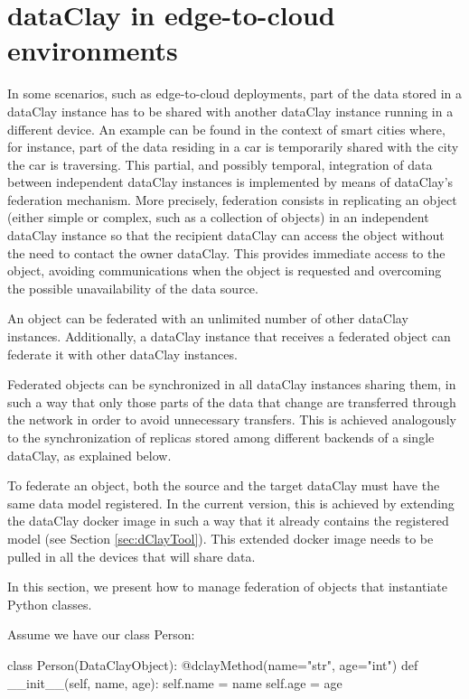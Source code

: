 \section{dataClay in edge-to-cloud environments}
\label{sec:pFederation}

In some scenarios, such as edge-to-cloud deployments, part of the data stored in a dataClay instance has to be shared with another dataClay instance running in a different device. An example can be found in the context of smart cities where, for instance, part of the data residing in a car is temporarily shared with the city the car is traversing. This partial, and possibly temporal, integration of data between independent dataClay instances is implemented by means of dataClay's federation mechanism.
More precisely, federation consists in replicating an object (either simple or complex, such as a collection of objects) in an independent dataClay instance so that the recipient dataClay can access the object without the need to contact the owner dataClay. This provides immediate access to the object, avoiding communications when the object is requested and overcoming the possible unavailability of the data source. 

An object can be federated with an unlimited number of other dataClay instances. Additionally, a dataClay instance that receives a federated object can federate it with other dataClay instances.

Federated objects can be synchronized in all dataClay instances sharing them, in such a way that only those parts of the data that change are transferred through the network in order to avoid unnecessary transfers. This is achieved analogously to the synchronization of replicas stored among different backends of a single dataClay, as explained below. 

To federate an object, both the source and the target dataClay must have the same data model registered. In the current version, this is achieved by extending the dataClay docker image in such a way that it already contains the registered model (see Section \ref{sec:dClayTool}). This extended docker image needs to be pulled in all the devices that will share data.

In this section, we present how to manage federation of objects that instantiate Python classes. 

Assume we have our class Person:

\begin{tBox}
\begin{python}
class Person(DataClayObject):
    @dclayMethod(name="str", age="int")
    def __init__(self, name, age):
        self.name = name
        self.age = age
\end{python}
\end{tBox}

